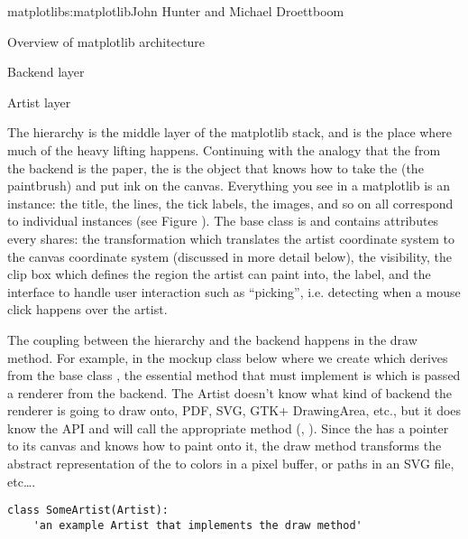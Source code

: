 \begin{aosachapter}{matplotlib}{s:matplotlib}{John Hunter and Michael Droettboom}
\begin{aosasect1}{Overview of matplotlib architecture}
\begin{aosasect2}{Backend layer}

\end{aosasect2}

\begin{aosasect2}{Artist layer}

The  hierarchy is the middle layer of the matplotlib
stack, and is the place where much of the heavy lifting happens.
Continuing with the analogy that the  from the backend
is the paper, the  is the object that knows how to take the
 (the paintbrush) and put ink on the canvas.  Everything you
see in a matplotlib  is an  instance: the title, the
lines, the tick labels, the images, and so on all correspond to
individual  instances (see Figure
\cite{fig.matplotlib.artists_tree}).  The base class is
 and contains attributes every 
shares: the transformation which translates the artist coordinate
system to the canvas coordinate system (discussed in more detail
below), the visibility, the clip box which defines the region the
artist can paint into, the label, and the interface to handle user
interaction such as ``picking'', i.e. detecting when a mouse click
happens over the artist.



The coupling between the  hierarchy and the backend
happens in the draw method.  For example, in the mockup class below
where we create  which derives from the base class
, the essential method that  must
implement is  which is passed a renderer from the backend.
The Artist doesn't know what kind of backend the renderer is going to
draw onto, PDF, SVG, GTK+ DrawingArea, etc., but it does know the
 API and will call the appropriate method
(, ).  Since the  has
a pointer to its canvas and knows how to paint onto it, the draw
method transforms the abstract representation of the  to
colors in a pixel buffer, or paths in an SVG file, etc\dots{}.

\begin{verbatim}
class SomeArtist(Artist):
    'an example Artist that implements the draw method'


\end{verbatim}
\end{aosasect2}
\end{aosasect1}
\end{aosachapter}
